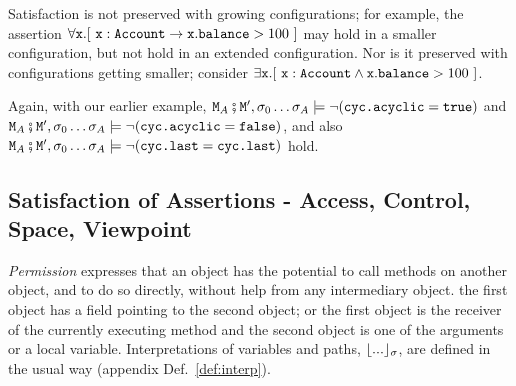 Satisfaction is not preserved with growing configurations; for example, the assertion $\forall {\mbox{\tt{x}}}. [\ {\mbox{\tt{x}}} : {\mbox{\tt{Account}}} \rightarrow {\mbox{\tt{x}}}.{\mbox{\tt{balance}}}>100\ ]$ 
may hold in a smaller configuration, but not hold in an extended configuration. 
Nor is it preserved with configurations getting smaller; consider \eg $\exists {\mbox{\tt{x}}}. [\ {\mbox{\tt{x}}} : {\mbox{\tt{Account}}} \wedge {\mbox{\tt{x}}}.{\mbox{\tt{balance}}}>100\ ]$.

\noindent
Again, with our earlier example,  
${\mbox{\tt{\ensuremath{{\mbox{\tt{M}}}}}}}_A\fatsemi {\mbox{\tt{\ensuremath{{\mbox{\tt{M}}}}}}}', \sigma_0 \ldots \sigma_A \models \neg ({\mbox{\tt{cyc.acyclic}}}={\mbox{\tt{true}}})$    and  
${\mbox{\tt{\ensuremath{{\mbox{\tt{M}}}}}}}_A\fatsemi {\mbox{\tt{\ensuremath{{\mbox{\tt{M}}}}}}}', \sigma_0 \ldots \sigma_A \models  \neg ({\mbox{\tt{cyc.acyclic}}}={\mbox{\tt{false}}})$, 
and also 
${\mbox{\tt{\ensuremath{{\mbox{\tt{M}}}}}}}_A\fatsemi {\mbox{\tt{\ensuremath{{\mbox{\tt{M}}}}}}}', \sigma_0 \ldots \sigma_A \models  \neg ({\mbox{\tt{cyc.last}}}={\mbox{\tt{cyc.last}}})$
hold.


\subsection{Satisfaction of Assertions - Access, Control, Space, Viewpoint}
\label{sect:pcsv} 

\textit{Permission} expresses that an object has the potential to call
methods on another object, and to do so directly, without  help from any
intermediary object.  the first object has a field pointing to the second object; or
the first object is the receiver of the currently executing method and the second object is one of the 
arguments or a local variable. Interpretations of variables and paths, ${\lfloor{ {...}}\rfloor_{\sigma}}$, are defined
in the usual way (appendix Def.~\ref{def:interp}).


